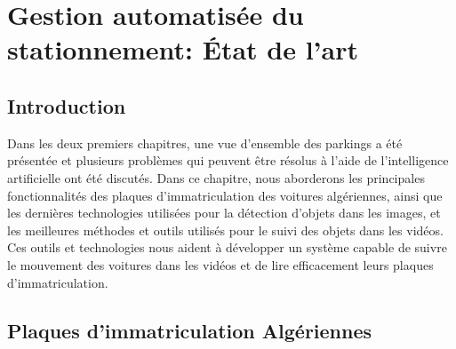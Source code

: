 \chapter{Gestion automatisée du stationnement: État de l'art}

\section{Introduction}
Dans les deux premiers chapitres, une vue d'ensemble des parkings a été présentée et plusieurs problèmes qui peuvent être résolus à l'aide de l'intelligence artificielle ont été discutés.
 Dans ce chapitre, nous aborderons les principales fonctionnalités des plaques d'immatriculation des voitures algériennes, ainsi que les dernières technologies utilisées pour la détection d'objets dans les images, et les meilleures méthodes et outils utilisés pour le suivi des objets dans les vidéos. Ces outils et technologies nous aident à développer un système capable de suivre le mouvement des voitures dans les vidéos et de lire efficacement leurs plaques d'immatriculation.

\section{Plaques d’immatriculation Algériennes}

